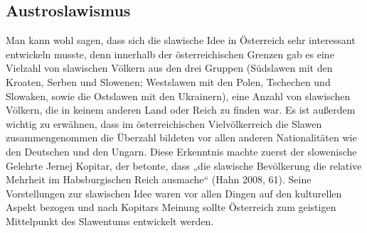 \documentclass[12pt,headsepline,a4paper]{scrartcl}
\begin{document}
\subsection{Austroslawismus}
Man kann wohl sagen, dass sich die slawische Idee in Österreich sehr interessant entwickeln
musste, denn innerhalb der österreichischen Grenzen gab es eine Vielzahl von slawischen
Völkern aus den drei Gruppen (Südslawen mit den Kroaten, Serben und Slowenen;
Westslawen mit den Polen, Tschechen und Slowaken, sowie die Ostslawen mit den
Ukrainern), eine Anzahl von slawischen Völkern, die in keinem anderen Land oder Reich zu
finden war. Es ist außerdem wichtig zu erwähnen, dass im österreichischen Vielvölkerreich
die Slawen zusammengenommen die Überzahl bildeten vor allen anderen Nationalitäten wie
den Deutschen und den Ungarn. Diese Erkenntnis machte zuerst der slowenische Gelehrte
Jernej Kopitar, der betonte, dass „die slawische Bevölkerung die relative Mehrheit im
Habsburgischen Reich ausmache“\autocite[61]{hahn} (Hahn 2008, 61). Seine Vorstellungen zur slawischen Idee
waren vor allen Dingen auf den kulturellen Aspekt bezogen und nach Kopitars Meinung sollte
Österreich zum geistigen Mittelpunkt des Slawentums entwickelt werden.
\end{document}
